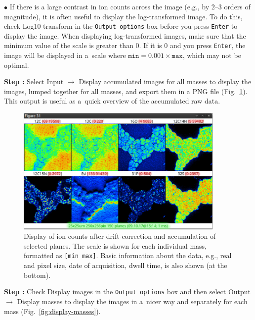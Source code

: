\documentclass[a4paper, 11pt]{article}
\newcommand{\ttt}[1]{\texttt{#1}}
\newcommand{\lans}[1]{{\color{magenta}#1}}
\newcommand{\lanscb}[1]{{\color{darkgreen}#1}}
\newcommand{\lanstf}[1]{{\color{cyan}#1}}
\newcommand\ra{\rightarrow}
\newcounter{step}
\newcommand\s{\addtocounter{step}{1}\vskip5pt\noindent\textbf{Step \thestep:}{ }}
\newcommand\bul{\vskip5pt\noindent$\bullet${ }}
\begin{document}
\bul If there is a large contrast in ion counts across the image (e.g., by 2--3 orders of magnitude), it is often useful to display the log-transformed image. To do this, check \lanscb{Log10-transform} in the \ttt{Output options} box before you press \ttt{Enter} to display the image. When displaying log-transformed images, make sure that the minimum value of the \lanstf{scale} is greater than 0. If it is 0 and you press \ttt{Enter}, the image will be displayed in a~scale where $\ttt{min} = 0.001\times\ttt{max}$, which may not be optimal.

\s Select \lans{Input} $\ra$ \lans{Display accumulated images for all masses} to display the images, lumped together for all masses, and export them in a PNG file (Fig.~\ref{fig:display-accu-planes}). This output is useful as a~quick overview of the accumulated raw data.

\begin{figure}[!ht]
\centering
\includegraphics[width=0.9\textwidth]{figs3/LANS-display-accu-planes}
\caption{\label{fig:display-accu-planes}%
Display of ion counts after drift-correction and accumulation of selected planes. The scale is shown for each individual mass, formatted as \ttt{[min max]}. Basic information about the data, e.g., real and pixel size, date of acquisition, dwell time, is also shown (at the bottom).}
\end{figure}

\s Check \lanscb{Display images} in the \ttt{Output options} box and then select \lans{Output} $\ra$ \lans{Display masses} to display the images in a~nicer way and separately for each mass (Fig.~\ref{fig:display-masses}). 
\end{document}
